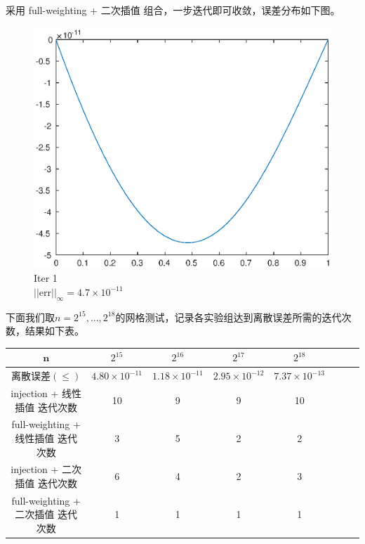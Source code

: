 \documentclass[lang=cn,10pt]{elegantbook}
\begin{document}
采用 full-weighting + 二次插值 组合，一步迭代即可收敛，误差分布如下图。

\begin{figure}[H]
  \centering
  \begin{minipage}[t]{0.24\linewidth}
      \centering
      \includegraphics[width=0.9\linewidth]{figure/1-5-11.eps}
      \caption*{\small Iter 1 \\ $||\text{err}||_\infty=4.7\times 10^{-11}$}
  \end{minipage}
\end{figure}

下面我们取$n=2^{15},...,2^{18}$的网格测试，记录各实验组达到离散误差所需的迭代次数，结果如下表。

\begin{table}[H]
  \centering
  \small
  \begin{tabular}{c|ccccccc}
   $\mathbf{n}$      & $2^{15}$                   & $2^{16}$                   & $2^{17}$                  & $2^{18}$                    \\ \hline
离散误差$(\leq)$   & $4.80\times 10^{-11}$ & $1.18\times 10^{-11}$ & $2.95\times 10^{-12}$ & $7.37\times 10^{-13}$ \\
injection + 线性插值 迭代次数        & 10 & 9 & 9 & 10 \\
full-weighting + 线性插值 迭代次数   & 3  & 5 & 2 & 2 \\
injection + 二次插值 迭代次数        & 6  & 4 & 2 & 3 \\
full-weighting + 二次插值 迭代次数   & 1  & 1 & 1 & 1 \\
\end{tabular}
\end{table}
\end{document}

